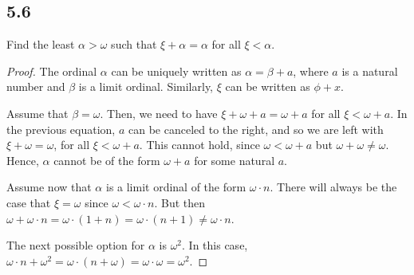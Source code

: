 \subsection*{5.6} Find the least $\alpha > \omega$ such that $\xi + \alpha = \alpha$ for all $\xi < \alpha$.

\begin{proof}
    The ordinal $\alpha$ can be uniquely written as $\alpha = \beta + a$, where $a$ is a natural number and $\beta$ is a limit ordinal. Similarly, $\xi$ can be written as $\phi + x$.

    Assume that $\beta = \omega$. Then, we need to have $\xi + \omega + a = \omega + a$ for all $\xi < \omega + a$. In the previous equation, $a$ can be canceled to the right, and so we are left with $\xi + \omega = \omega$, for all $\xi < \omega+a$. This cannot hold, since $\omega < \omega + a$ but $\omega + \omega \neq \omega$. Hence, $\alpha$ cannot be of the form $\omega + a$ for some natural $a$.


    Assume now that $\alpha$ is a limit ordinal of the form $\omega \cdot n$. There will always be the case that $\xi = \omega$ since $\omega < \omega \cdot n$. But then $\omega + \omega \cdot n = \omega \cdot (1 + n) = \omega \cdot (n+1) \neq \omega \cdot n$.

    The next possible option for $\alpha$ is $\omega^2$. In this case, $\omega \cdot n + \omega^2 = \omega \cdot (n + \omega) = \omega \cdot \omega = \omega^2$.
\end{proof}

